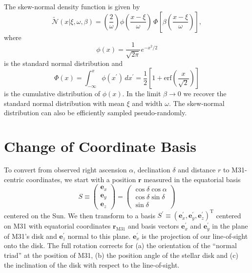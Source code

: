 \documentclass[preprint]{aastex}
\newcommand{\eqlabel}[1]{\label{eq:#1}}
\begin{document}
The skew-normal density function is given by \citep{OHagan:1976a,Azzalini:1996}
\begin{equation}
    \eqlabel{sn}
    \tilde{\mathcal{N}} (x | \xi, \omega, \beta) = \left ( \frac{2}{\omega} \right ) \phi \left ( \frac{x-\xi}{\omega} \right ) \, \Phi \left [ \beta \left ( \frac{x-\xi}{\omega} \right ) \right ],
\end{equation}
where
\begin{equation}
    \phi (x) = \frac{1}{\sqrt{2\pi}} e^{-x^2/2}
\end{equation}
is the standard normal distribution and
\begin{equation}
    \Phi(x) = \int _{-\infty} ^x \phi(x^\prime) \, dx^\prime = \frac{1}{2} \left [ 1 + \mathrm{erf} \left ( \frac{x}{\sqrt{2}} \right )\right ]
\end{equation}
is the cumulative distribution of $\phi(x)$.  In the limit $\beta \rightarrow 0$ we recover the standard normal distribution with mean $\xi$ and width $\omega$.  The skew-normal distribution can also be efficiently sampled pseudo-randomly.



\section{Change of Coordinate Basis}

\label{sect:coords}

To convert from observed right ascension $\alpha$, declination $\delta$ and distance $r$ to M31-centric coordinates, we start with a position $\mathbf{r}$ measured in the equatorial basis
\begin{equation}
    S \equiv \left ( \begin{array}{c}
        \mathbf{e}_x \\ \mathbf{e}_y \\ \mathbf{e}_z
    \end{array} \right ) = \left ( \begin{array}{c}
        \cos \delta \cos \alpha \\
        \cos \delta \sin \delta \\
        \sin \delta
    \end{array} \right )
\end{equation}
centered on the Sun.  We then transform to a basis $S^\prime \equiv (\mathbf{e}_x^\prime, \mathbf{e}_y^\prime,\mathbf{e}_z^\prime)^\mathrm{T}$ centered on M31 with equatorial coordinates $\mathbf{r}_\mathrm{M31}$ and basis vectors $\mathbf{e}_x^\prime$ and $\mathbf{e}_y^\prime$ in the plane of M31's disk and $\mathbf{e}_z^\prime$ normal to this plane.  $\mathbf{e}_x^\prime$ is the projection of our line-of-sight onto the disk.  The full rotation corrects for (a) the orientation of the ``normal triad'' at the position of M31, (b) the position angle of the stellar disk and (c) the inclination of the disk with respect to the line-of-sight.
\end{document}

